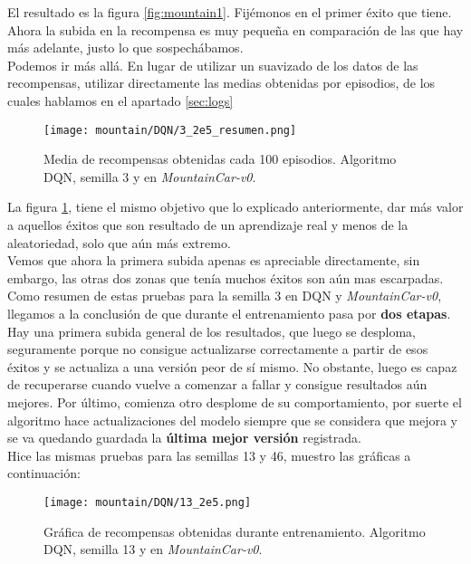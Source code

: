 \documentclass[11pt,fleqn]{book} %
\begin{document}
El resultado es la figura \ref{fig:mountain1}. Fijémonos en el primer éxito que tiene. Ahora la subida en la recompensa es muy pequeña en comparación de las que hay más adelante, justo lo que sospechábamos. \\

Podemos ir más allá. En lugar de utilizar un suavizado de los datos de las recompensas, utilizar directamente las medias obtenidas por episodios, de los cuales hablamos en el apartado \ref{sec:logs}

\begin{figure}[H]
	\centering\texttt{[image: mountain/DQN/3\_2e5\_resumen.png]}
	\caption{Media de recompensas obtenidas cada 100 episodios. Algoritmo DQN, semilla 3 y en \textit{MountainCar-v0}.}
	\label{fig:mountain3} %
\end{figure}

La figura \ref{fig:mountain3}, tiene el mismo objetivo que lo explicado anteriormente, dar más valor a aquellos éxitos que son resultado de un aprendizaje real y menos de la aleatoriedad, solo que aún más extremo. \\

Vemos que ahora la primera subida apenas es apreciable directamente, sin embargo, las otras dos zonas que tenía muchos éxitos son aún mas escarpadas. Como resumen de estas pruebas para la semilla 3 en DQN y \textit{MountainCar-v0}, llegamos a la conclusión de que durante el entrenamiento pasa por \textbf{dos etapas}. Hay una primera subida general de los resultados, que luego se desploma, seguramente porque no consigue actualizarse correctamente a partir de esos éxitos y se actualiza a una versión peor de sí mismo. No obstante, luego es capaz de recuperarse cuando vuelve a comenzar a fallar y consigue resultados aún mejores. Por último, comienza otro desplome de su comportamiento, por suerte el algoritmo hace actualizaciones del modelo siempre que se considera que mejora y se va quedando guardada la \textbf{última mejor versión} registrada. \\

Hice las mismas pruebas para las semillas 13 y 46, muestro las gráficas a continuación:

\begin{figure}[H]
	\centering\texttt{[image: mountain/DQN/13\_2e5.png]}
	\caption{Gráfica de recompensas obtenidas durante entrenamiento. Algoritmo DQN, semilla 13 y en \textit{MountainCar-v0}.}
	\label{fig:mountain4} %
\end{figure}
\end{document}
